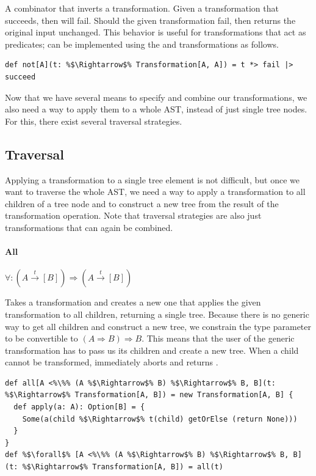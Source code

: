 \documentclass[10pt,a4paper,oneside]{scrreprt}
\begin{document}
\vspace{7pt} A combinator that inverts a transformation. Given a transformation that succeeds, then  will fail. Should the given transformation fail, then  returns the original input unchanged. This behavior is useful for transformations that act as predicates;  can be implemented using the  and  transformations as follows.

\begin{lstlisting}
def not[A](t: %$\Rightarrow$% Transformation[A, A]) = t *> fail |> succeed
\end{lstlisting}

Now that we have several means to specify and combine our transformations, we also need a way to apply them to a whole AST, instead of just single tree nodes. For this, there exist several traversal strategies.

\subsection{Traversal}

Applying a transformation to a single tree element is not difficult, but once we want to traverse the whole AST, we need a way to apply a transformation to all children of a tree node and to construct a new tree from the result of the transformation operation. Note that traversal strategies are also just transformations that can again be combined.

\paragraph{All} \hfill  $\forall: (A \overset{t}{\rightarrow} [B]) \Rightarrow (A \overset{t}{\rightarrow} [B])$

\vspace{7pt} Takes a transformation and creates a new one that applies the given transformation to all children, returning a single tree. Because there is no generic way to get all children and construct a new tree, we constrain the type parameter  to be convertible to $(A \Rightarrow B) \Rightarrow B$. This means that the user of the generic transformation has to pass us its children and create a new tree. When a child cannot be transformed,  immediately aborts and returns .

\begin{lstlisting}
def all[A <%\%% (A %$\Rightarrow$% B) %$\Rightarrow$% B, B](t: %$\Rightarrow$% Transformation[A, B]) = new Transformation[A, B] {
  def apply(a: A): Option[B] = {
    Some(a(child %$\Rightarrow$% t(child) getOrElse (return None)))
  }
}
def %$\forall$% [A <%\%% (A %$\Rightarrow$% B) %$\Rightarrow$% B, B](t: %$\Rightarrow$% Transformation[A, B]) = all(t)
\end{lstlisting}
\end{document}
